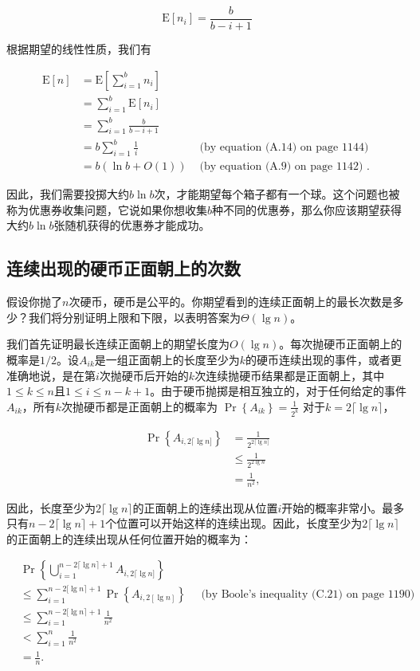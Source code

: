 \documentclass[lang=cn,newtx,10pt,scheme=chinese]{elegantbook}
\begin{document}
$$
\mathrm{E}\left[n_i\right]=\frac{b}{b-i+1}
$$

根据期望的线性性质，我们有

$$
\begin{array}{rlr}
\mathrm{E}[n] & =\mathrm{E}\left[\sum_{i=1}^b n_i\right] \\
& =\sum_{i=1}^b \mathrm{E}\left[n_i\right] & \\
& =\sum_{i=1}^b \frac{b}{b-i+1} & \\
& =b \sum_{i=1}^b \frac{1}{i} & \text { (by equation (A.14) on page 1144) } \\
& =b(\ln b+O(1)) & \text { (by equation (A.9) on page 1142) } .
\end{array}
$$

因此，我们需要投掷大约$b\ln b$次，才能期望每个箱子都有一个球。这个问题也被称为优惠券收集问题，它说如果你想收集$b$种不同的优惠券，那么你应该期望获得大约$b\ln b$张随机获得的优惠券才能成功。

\subsection{连续出现的硬币正面朝上的次数}

假设你抛了$n$次硬币，硬币是公平的。你期望看到的连续正面朝上的最长次数是多少？我们将分别证明上限和下限，以表明答案为$\Theta(\lg n)$。

我们首先证明最长连续正面朝上的期望长度为$O(\lg n)$。每次抛硬币正面朝上的概率是$1/2$。设$A_{ik}$是一组正面朝上的长度至少为$k$的硬币连续出现的事件，或者更准确地说，是在第$i$次抛硬币后开始的$k$次连续抛硬币结果都是正面朝上，其中$1\leq k\leq n$且$1\leq i\leq n-k+1$。由于硬币抛掷是相互独立的，对于任何给定的事件$A_{ik}$，所有$k$次抛硬币都是正面朝上的概率为
$\operatorname{Pr}\left\{A_{ik}\right\}=\frac{1}{2^k}$
对于$k=2\lceil\lg n\rceil$，

$$
\begin{aligned}
\operatorname{Pr}\left\{A_{i, 2\lceil\lg n]}\right\} & =\frac{1}{2^{2\lceil\lg n]}} \\
& \leq \frac{1}{2^{2 \lg n}} \\
& =\frac{1}{n^2},
\end{aligned}
$$

因此，长度至少为$2\lceil\lg n\rceil$的正面朝上的连续出现从位置$i$开始的概率非常小。最多只有$n-2\lceil\lg n\rceil+1$个位置可以开始这样的连续出现。因此，长度至少为$2\lceil\lg n\rceil$的正面朝上的连续出现从任何位置开始的概率为：

$$
\begin{aligned}
& \operatorname{Pr}\left\{\bigcup_{i=1}^{n-2\lceil\lg n\rceil+1} A_{i, 2\lceil\lg n]}\right\} \\
& \leq \sum_{i=1}^{n-2[\lg n\rceil+1} \operatorname{Pr}\left\{A_{i, 2[\lg n]}\right\} \quad \text { (by Boole's inequality (C.21) on page 1190) } \\
& \leq \sum_{i=1}^{n-2[\lg n\rceil+1} \frac{1}{n^2} \\
&<\sum_{i=1}^n \frac{1}{n^2} \\
&=\frac{1}{n} .
\end{aligned}
$$
\end{document}
